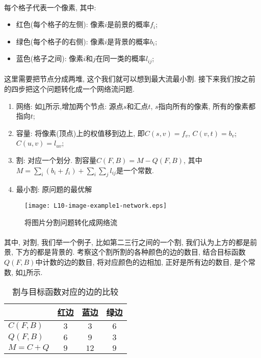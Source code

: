 \paragraph{}每个格子代表一个像素, 其中:
 \begin{itemize}
 \item
  红色(每个格子的左侧): 像素$i$是前景的概率$f_i$;
  \item
   绿色(每个格子的右侧): 像素$i$是背景的概率$b_i$;
   \item
    蓝色(格子之间): 像素$i$和$j$在同一类的概率$l_{ij}$;
     \end{itemize}
        \paragraph{}这里需要把节点分成两堆, 这个我们就可以想到最大流最小割. 接下来我们按之前的四步把这个问题转化成一个网络流问题.
\begin{enumerate}
 \item 网络: 如\figurename\ref{Figure: image_segmentaion_exmaple_networkflow}所示,增加两个节点: 源点$s$和汇点$t$, $s$指向所有的像素, 所有的像素都指向$t$;
 \item 容量: 将像素(顶点)上的权值移到边上, 即$C(s,v)= f_v$, $C(v,t)= b_v$; $C(u,v)=l_{uv}$;
 \item 割: 对应一个划分.  割容量$C(F, B) = M - Q(F, B)$, 其中$M=\sum_i (b_i + f_i) + \sum_i\sum_j l_{ij}$是一个常数.
 \item 最小割: 原问题的最优解
\end{enumerate}
                \begin{figure}[h]
                    \centering
                    \texttt{[image: L10-image-example1-network.eps]}
                    \caption{将图片分割问题转化成网络流}
                    \label{Figure: image_segmentaion_exmaple_networkflow}
                \end{figure}
        \paragraph{}其中, 对割, 我们举一个例子, 比如第二三行之间的一个割, 我们认为上方的都是前景, 下方的都是背景的. 考察这个割所割的各种颜色的边的数目, 结合目标函数$Q(F,B)$中计数的边的数目, 将对应颜色的边相加, 正好是所有边的数目, 是个常数, 如\tablename\ref{Table: image_section_cut_and_objective}所示.
        \begin{table}[h]
        \centering
        \caption{割与目标函数对应的边的比较}
        \label{Table: image_section_cut_and_objective}
        \begin{tabular}{l|ccc}
        \hline
                 & 红边 & 蓝边 & 绿边 \\
        \hline
        $C(F,B)$ & $3$  & $3$  & $6$  \\
        $Q(F,B)$ & $6$  & $9$  & $3$  \\
        \hline
        $M= C+Q$      & $9$  & $12$ & $9$ \\
        \hline
        \end{tabular}
        \end{table}

